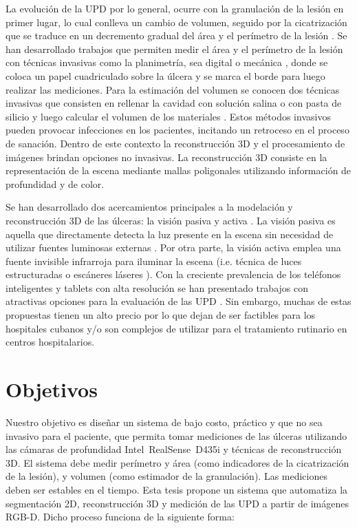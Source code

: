 La evolución de la UPD por lo general, ocurre con la granulación de la lesión en primer lugar, lo cual conlleva un cambio de volumen, seguido por la cicatrización que se traduce en un decremento gradual del área y el perímetro de la lesión  \cite{kecelj2007measurement}. Se han desarrollado trabajos que permiten medir el área y el perímetro de la lesión con técnicas invasivas como la planimetría, sea digital o mecánica \cite{oien2002measuring}, donde se coloca un papel cuadriculado sobre la úlcera y se marca el borde para luego realizar las mediciones. Para la estimación del volumen se conocen dos técnicas invasivas que consisten en rellenar la cavidad con solución salina o con pasta de silicio y luego calcular el volumen de los materiales \cite{langemo2008measuring}. Estos métodos invasivos pueden provocar infecciones en los pacientes, incitando un retroceso en el proceso de sanación. Dentro de este contexto la reconstrucción 3D y el procesamiento de imágenes brindan opciones no invasivas. La reconstrucción 3D consiste en la representación de la escena mediante mallas poligonales utilizando información de profundidad y de color.

Se han desarrollado dos acercamientos principales a la modelación y reconstrucción 3D de las úlceras: la visión pasiva y activa \cite{zenteno2018volumetric}. La visión pasiva es aquella que directamente detecta la luz presente en la escena sin necesidad de utilizar fuentes luminosas externas \cite{malian2004medphos, plassmann1998mavis}. Por otra parte, la visión activa emplea una fuente invisible infrarroja para iluminar la escena (i.e. técnica de luces estructuradas \cite{filko2018wound, ching2022segm3d, ozturk1996new} o escáneres láseres \cite{callieri2003derma, krouskop2002noncontact}). Con la creciente prevalencia de los teléfonos inteligentes y tablets con alta resolución se han presentado trabajos con atractivas opciones para la evaluación de las UPD \cite{foltynski2014new, wang2014smartphone}. Sin embargo, muchas de estas propuestas tienen un alto precio por lo que dejan de ser factibles para los hospitales cubanos y/o son complejos de utilizar para el tratamiento rutinario en centros hospitalarios.

\section*{Objetivos}

Nuestro objetivo es diseñar un sistema de bajo costo, práctico y que no sea invasivo para el paciente, que permita tomar mediciones de las úlceras utilizando las cámaras de profundidad Intel\textregistered~RealSense\texttrademark~D435i y técnicas de reconstrucción 3D. El sistema debe medir perímetro y área (como indicadores de la cicatrización de la lesión), y volumen (como estimador de la granulación). Las mediciones deben ser estables en el tiempo. Esta tesis propone un sistema que automatiza la segmentación 2D, reconstrucción 3D y medición de las UPD a partir de imágenes RGB-D. Dicho proceso funciona de la siguiente forma: 

